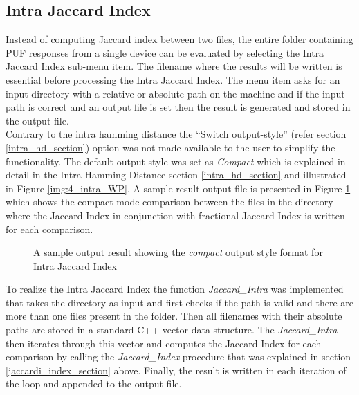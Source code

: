 \subsection{Intra Jaccard Index}
Instead of computing Jaccard index between two files, the entire folder containing PUF responses from a single device can be evaluated by selecting the Intra Jaccard Index sub-menu item. The filename where the results will be written is essential before processing the Intra Jaccard Index. The menu item asks for an input directory with a relative or absolute path on the machine and if the input path is correct and an output file is set then the result is generated and stored in the
output file.\\

Contrary to the intra hamming distance the ``Switch output-style'' (refer section \ref{intra_hd_section}) option was not made available to the user to simplify the functionality. The default output-style was set as \emph{Compact} which is explained in detail in the Intra Hamming Distance section \ref{intra_hd_section} and illustrated in Figure \ref{img:4_intra_WP}. A sample result output file is presented in Figure \ref{img:intra_jaccardi_compact} which shows the compact mode comparison between the files in the
directory where the Jaccard Index in conjunction with fractional Jaccard Index is written for each comparison.\\

\begin{figure}[h]
\centering
{}
\caption{A sample output result showing the \emph{compact} output style format for Intra Jaccard Index }
\label{img:intra_jaccardi_compact}
\end{figure}

To realize the Intra Jaccard Index the function \emph{Jaccard\_Intra} was implemented that takes the directory as input and first checks if the path is valid and there are more than one files present in the folder. Then all filenames with their absolute paths are stored in a standard C++ vector data structure. The \emph{Jaccard\_Intra} then iterates through this vector and computes the Jaccard Index for each comparison by calling the \emph{Jaccard\_Index} procedure that was explained in  section
\ref{jaccardi_index_section}
above. Finally, the result is written in each iteration of the loop and appended to the output file.\\

